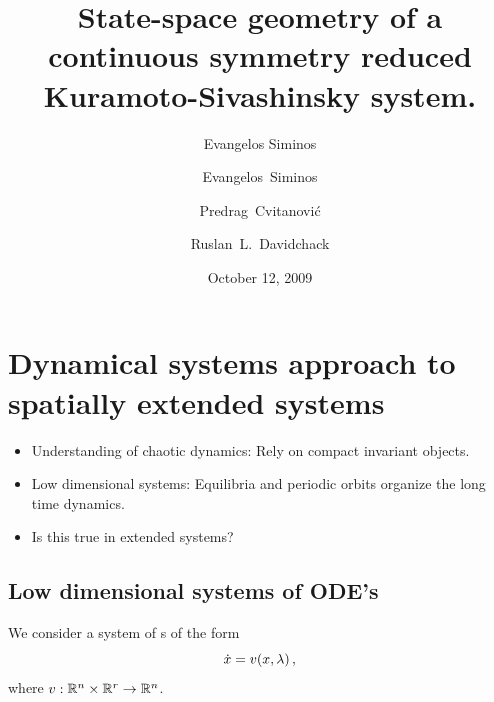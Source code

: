 \documentclass{beamer}
\title{State-space geometry of a continuous symmetry reduced Kuramoto-Sivashinsky system.}
\author{Evangelos Siminos}
\author[Siminos, Cvitanovi\'c, Davidchack]
{
  \textcolor{green!50!black}{Evangelos~Siminos}\inst{1} \and
  {Predrag~Cvitanovi\'c}\inst{1} \and
  {Ruslan~L.~Davidchack}\inst{2}
}
\institute
{
  \inst{1}%
  Georgia Institute of Technology, USA
  \and
  \vskip-2mm
  \inst{2}%
  University of Leicester, United Kingdom
}
\date{October 12, 2009}
\begin{document}
\begin{frame}
  \titlepage
\end{frame}

\section[Dynamicist's view of turbulence]{Dynamical systems approach to spatially extended systems}

\begin{frame}{}
 \begin{itemize}
  \item Understanding of chaotic dynamics: Rely on compact invariant objects.
  \item Low dimensional systems: Equilibria and periodic orbits organize the long time dynamics.
  \item Is this true in extended systems?
 \end{itemize}

\end{frame}

\subsection{Low dimensional systems of ODE's}

\begin{frame}
We consider a system of \ode s of the form
\[
	\dot{x} = v(x,\lambda)\,,
\]
where $v: \mathbb{R}^{n}\times\mathbb{R}^{r} \rightarrow \mathbb{R}^{n}$.
\end{frame}

% 
\end{document}
